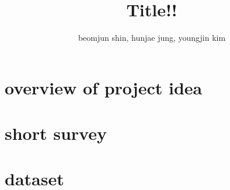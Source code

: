

\title{Title!!}
\author{beomjun shin, hunjae jung, youngjin kim}

\newtheorem{qu}{Question}



\maketitle

\section{overview of project idea}

\section{short survey}

\section{dataset}



